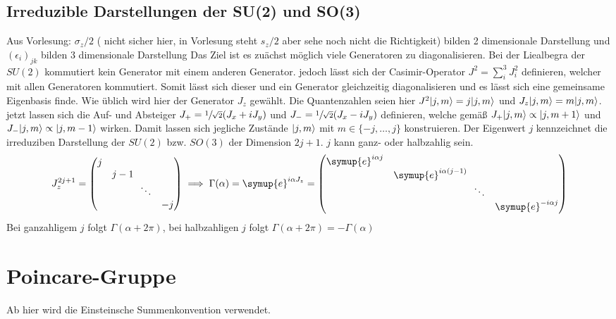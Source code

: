 \documentclass[
  captions=tableheading,  %
  titlepage=firstiscover, %
]{scrartcl}
\DeclarePairedDelimiter{\ket}{\lvert}{\rangle}
\begin{document}
\subsection{Irreduzible Darstellungen der SU(2) und SO(3)}
{\color{green} Aus Vorlesung: $\sigma_z/2$ ({\color{red} nicht sicher hier, in Vorlesung steht $s_z/2$ 
aber sehe noch nicht die Richtigkeit}) bilden 2 dimensionale Darstellung und $(\epsilon_i)_{jk}$ bilden 3 dimensionale Darstellung}
Das Ziel ist es zuächst möglich viele Generatoren zu diagonalisieren.
Bei der Liealbegra der $SU(2)$ kommutiert kein Generator mit einem anderen Generator.
jedoch lässt sich der Casimir-Operator $J^2 = \sum_i^3 J_i^2$ definieren,
welcher mit allen Generatoren kommutiert.
Somit lässt sich dieser und ein Generator gleichzeitig diagonalisieren und es lässt sich eine 
gemeinsame Eigenbasis finde. 
Wie üblich wird hier der Generator $J_z$ gewählt. 
Die Quantenzahlen seien hier $J^2 \ket{j,m} = j\ket{j,m}$ und $J_z \ket{j,m} = m \ket{j,m}$.
jetzt lassen sich die Auf- und Absteiger $J_+ = \sfrac{1}{\sqrt{2}}(J_x + iJ_y)$ und
$J_- = \sfrac{1}{\sqrt{2}} (J_x - i J_y)$ definieren, welche gemäß
$J_+ \ket{j,m} \propto \ket{j,m+1}$ und $J_-\ket{j,m} \propto \ket{j,m-1}$ wirken.
Damit lassen sich jegliche Zustände $\ket{j,m}$ mit $m \in \{-j,\ldots,j\}$ konstruieren.
Der Eigenwert $j$ kennzeichnet die irreduziben Darstellung der $SU(2)$ bzw. $SO(3)$ der 
Dimension $2j+1$.
$j$ kann ganz- oder halbzahlig sein.
\begin{equation*}
  J_z^{2j+1} = 
  \begin{pmatrix}
    j & & &  \\
    & j - 1 & & \\
    & & \! \!  \ddots & \\
    & & & -j
  \end{pmatrix}
  \implies \Gamma(\alpha) = \symup{e}^{i\alpha J_z} = 
  \begin{pmatrix}
    \symup{e}^{i\alpha j} & & &  \\
    & \symup{e}^{i\alpha (j-1)} & & \\
    & & \! \!  \ddots & \\
    & & & \symup{e}^{- i\alpha j}
  \end{pmatrix}
\end{equation*}
Bei ganzahligem $j$ folgt $\Gamma(\alpha +2\pi)$, bei halbzahligen $j$ folgt $\Gamma(\alpha + 2\pi) = - 
\Gamma(\alpha)$
\section{Poincare-Gruppe}
Ab hier wird die Einsteinsche Summenkonvention verwendet.
\end{document}
